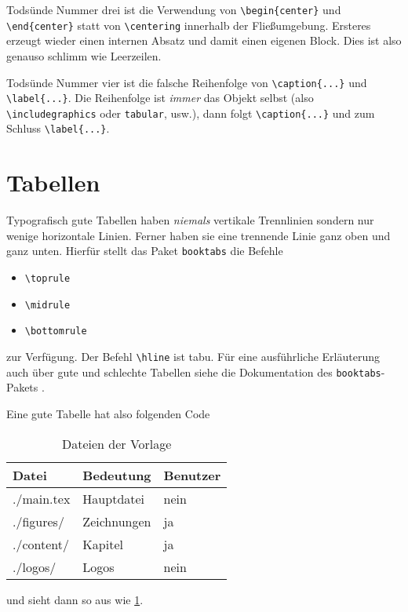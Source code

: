 Todsünde Nummer drei ist die Verwendung von \verb#\begin{center}# und
\verb#\end{center}# statt von \verb#\centering# innerhalb der Fließumgebung.
Ersteres erzeugt wieder einen internen Absatz und damit einen eigenen Block.
Dies ist also genauso schlimm wie Leerzeilen.

Todsünde Nummer vier ist die falsche Reihenfolge von \verb#\caption{...}# und
\verb#\label{...}#. Die Reihenfolge ist \emph{immer} das Objekt selbst (also
\verb#\includegraphics# oder \verb#tabular#, usw.), dann folgt \verb#\caption{...}#
und zum Schluss \verb#\label{...}#.

\section{Tabellen}

Typografisch gute Tabellen haben \emph{niemals} vertikale Trennlinien sondern
nur wenige horizontale Linien. Ferner haben sie eine trennende Linie ganz oben
und ganz unten. Hierfür stellt das Paket \texttt{booktabs} die Befehle
\begin{itemize}
  \item \verb#\toprule#
	\item \verb#\midrule#
	\item \verb#\bottomrule#
\end{itemize}
zur Verfügung. Der Befehl \verb#\hline# ist tabu. Für eine ausführliche
Erläuterung auch über gute und schlechte Tabellen siehe die Dokumentation des
\texttt{booktabs}-Pakets \parencite{Fear2005}.

Eine gute Tabelle hat also folgenden Code
\begin{latex}[caption={Tabellen in LaTeX},label={lst:tables}]
\begin{table}
  \centering
  \begin{tabular}{l l l}                       \toprule
    Datei       &  Bedeutung    &  Benutzer \\ \midrule
    ./main.tex  &  Hauptdatei   &  nein     \\
    ./figures/  &  Zeichnungen  &  ja       \\
    ./content/  &  Kapitel      &  ja       \\
    ./logos/    &  Logos        &  nein     \\ \bottomrule
  \end{tabular}
  \caption{Dateien der Vorlage}
  \label{tab:files-dirs-of-template}
\end{table}
\end{latex}
und sieht dann so aus wie \cref{tab:files-dirs-of-template}.

